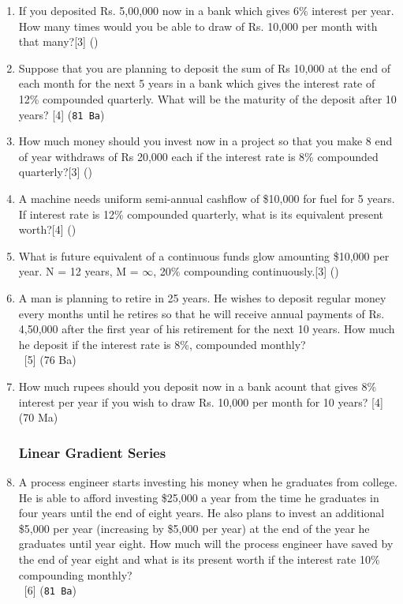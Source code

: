 \documentclass[12pt]{article}
\newcommand{\enter}{\\\textcolor{white}{1}}
\begin{document}
\begin{enumerate}[noitemsep, topsep=0pt]
			\item If you deposited Rs. 5,00,000 now in a bank which gives 6\% interest per year. How many times would you be able to draw of Rs. 10,000 per month with that many?\hfill[3] ()
	
			\item Suppose that you are planning to deposit the sum of Rs 10,000 at the end of each month for the next 5 years in a bank which gives the interest rate of 12\% compounded quarterly. What will be the maturity of the deposit after 10 years? \hfill[4] (\texttt{81 Ba})

			\item How much money should you invest now in a project so that you make 8 end of year withdraws of Rs 20,000 each if the interest rate is 8\% compounded quarterly?\hfill[3] ()

			\item A machine needs uniform semi-annual cashflow of \$10,000 for fuel for 5 years. If interest rate is 12\% compounded quarterly, what is its equivalent present worth?\hfill[4] ()

			\item What is future equivalent of a continuous funds glow amounting \$10,000 per year. N = 12 years, M = $\infty$, 20\% compounding continuously.\hfill[3] ()

			\item A man is planning to retire in 25 years. He wishes to deposit regular money every months until he retires so that he will receive annual payments of Rs. 4,50,000 after the first year of his retirement for the next 10 years. How much he deposit if the interest rate is 8\%, compounded monthly?
			\enter\hfill[5] (76 Ba)

			\item How much rupees should you deposit now in a bank acount that gives 8\% interest per year if you wish to draw Rs. 10,000 per month for 10 years? \hfill [4] (70 Ma)
	
		\subsubsection{Linear Gradient Series}

			\item A process engineer starts investing his money when he graduates from college. He is able to afford investing \$25,000 a year from the time he graduates in four years until the end of eight years. He also plans to invest an additional \$5,000 per year (increasing by \$5,000 per year) at the end of the year he graduates until year eight. How much will the process engineer have saved by the end of year eight and what is its present worth if the interest rate 10\% compounding monthly?
			\enter\hfill [6] (\texttt{81 Ba})


\end{enumerate}
\end{document}
